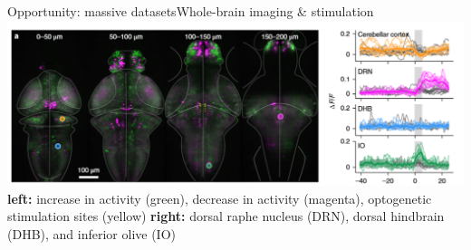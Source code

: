 \begin{frame}{Opportunity: massive datasets}{Whole-brain imaging \& stimulation}
				\centering
		    \includegraphics[width=1.1\textwidth,center]{media/drn_opto}
        \linebreak
        \textbf{left:} increase in activity (green), decrease in activity (magenta), optogenetic stimulation sites (yellow)
				\textbf{right:} dorsal raphe nucleus (DRN), dorsal hindbrain (DHB), and inferior olive (IO)
\end{frame}


